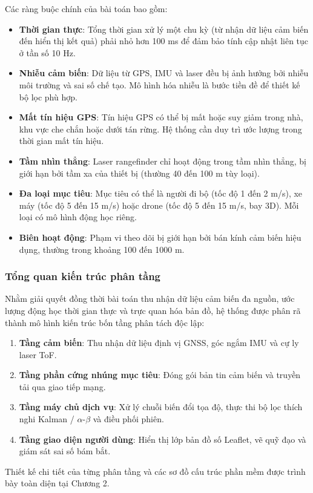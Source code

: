 Các ràng buộc chính của bài toán bao gồm:

\begin{itemize}
    \item \textbf{Thời gian thực}: Tổng thời gian xử lý một chu kỳ (từ nhận dữ liệu cảm biến đến hiển thị kết quả) phải nhỏ hơn 100 ms để đảm bảo tính cập nhật liên tục ở tần số 10 Hz.
    \item \textbf{Nhiễu cảm biến}: Dữ liệu từ GPS, IMU và laser đều bị ảnh hưởng bởi nhiễu môi trường và sai số chế tạo. Mô hình hóa nhiễu là bước tiền đề để thiết kế bộ lọc phù hợp.
    \item \textbf{Mất tín hiệu GPS}: Tín hiệu GPS có thể bị mất hoặc suy giảm trong nhà, khu vực che chắn hoặc dưới tán rừng. Hệ thống cần duy trì ước lượng trong thời gian mất tín hiệu.
    \item \textbf{Tầm nhìn thẳng}: Laser rangefinder chỉ hoạt động trong tầm nhìn thẳng, bị giới hạn bởi tầm xa của thiết bị (thường 40 đến 100 m tùy loại).
    \item \textbf{Đa loại mục tiêu}: Mục tiêu có thể là người đi bộ (tốc độ 1 đến 2 m/s), xe máy (tốc độ 5 đến 15 m/s) hoặc drone (tốc độ 5 đến 15 m/s, bay 3D). Mỗi loại có mô hình động học riêng.
    \item \textbf{Biên hoạt động}: Phạm vi theo dõi bị giới hạn bởi bán kính cảm biến hiệu dụng, thường trong khoảng 100 đến 1000 m.
\end{itemize}

\subsubsection{Tổng quan kiến trúc phân tầng}

\hspace{0.5cm} Nhằm giải quyết đồng thời bài toán thu nhận dữ liệu cảm biến đa nguồn, ước lượng động học thời gian thực và trực quan hóa bản đồ, hệ thống được phân rã thành mô hình kiến trúc bốn tầng phân tách độc lập:
\begin{enumerate}
    \item \textbf{Tầng cảm biến}: Thu nhận dữ liệu định vị GNSS, góc ngắm IMU và cự ly laser ToF.
    \item \textbf{Tầng phần cứng nhúng mục tiêu}: Đóng gói bản tin cảm biến và truyền tải qua giao tiếp mạng.
    \item \textbf{Tầng máy chủ dịch vụ}: Xử lý chuỗi biến đổi tọa độ, thực thi bộ lọc thích nghi Kalman / $\alpha$-$\beta$ và điều phối phiên.
    \item \textbf{Tầng giao diện người dùng}: Hiển thị lớp bản đồ số Leaflet, vẽ quỹ đạo và giám sát sai số bám bắt.
\end{enumerate}
Thiết kế chi tiết của từng phân tầng và các sơ đồ cấu trúc phần mềm được trình bày toàn diện tại Chương 2.

